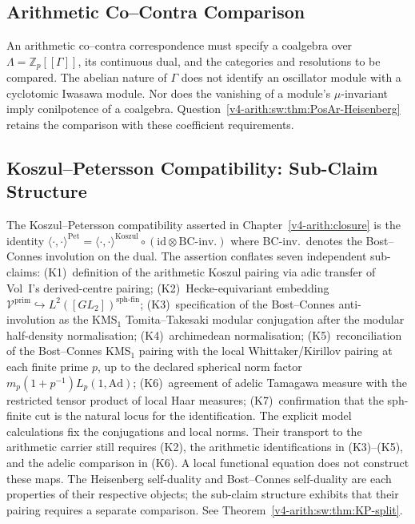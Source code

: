 \subsection{Arithmetic Co--Contra Comparison}

An arithmetic co--contra correspondence must specify a coalgebra over
\(\Lambda=\mathbb Z_p[[\Gamma]]\), its continuous dual, and the
categories and resolutions to be compared. The abelian nature of
\(\Gamma\) does not identify an oscillator module with a cyclotomic
Iwasawa module. Nor does the vanishing of a module's \(\mu\)-invariant
imply conilpotence of a coalgebra.
Question~\ref{v4-arith:sw:thm:PosAr-Heisenberg} retains the comparison
with these coefficient requirements.

\subsection{Koszul--Petersson Compatibility: Sub-Claim Structure}

The Koszul--Petersson compatibility asserted in Chapter~\ref{v4-arith:closure}
is the identity
\(\langle\cdot,\cdot\rangle^{\mathrm{Pet}}=\langle\cdot,\cdot\rangle^{\mathrm{Koszul}}\circ(\mathrm{id}\otimes\text{BC-inv.})\)
where BC-inv.\ denotes the Bost--Connes involution on the dual.
The assertion conflates seven independent sub-claims:
(K1)~definition of the arithmetic Koszul pairing via adic transfer of
Vol~I's derived-centre pairing;
(K2)~Hecke-equivariant embedding
\(\mathcal{V}^{\mathrm{prim}}\hookrightarrow L^{2}([GL_{2}])^{\mathrm{sph\text{-}fin}}\);
(K3)~specification of the Bost--Connes anti-involution as the
KMS\({}_{1}\) Tomita--Takesaki modular conjugation after the modular
half-density normalisation;
(K4)~archimedean normalisation;
(K5)~reconciliation of the Bost--Connes KMS\({}_{1}\) pairing with
the local Whittaker/Kirillov pairing at each finite prime \(p\), up
to the declared spherical norm factor
\(m_p(1+p^{-1})L_p(1,\mathrm{Ad})\);
(K6)~agreement of adelic Tamagawa measure with the restricted tensor
product of local Haar measures;
(K7)~confirmation that the sph-finite cut is the natural locus for
the identification.
The explicit model calculations fix the conjugations and local
norms. Their transport to the arithmetic carrier still requires
(K2), the arithmetic identifications in (K3)--(K5), and the adelic
comparison in (K6). A local functional equation does not construct
these maps.
The Heisenberg self-duality and Bost--Connes self-duality are each
properties of their respective objects; the sub-claim structure
exhibits that their pairing requires a separate comparison.
See Theorem~\ref{v4-arith:sw:thm:KP-split}.

